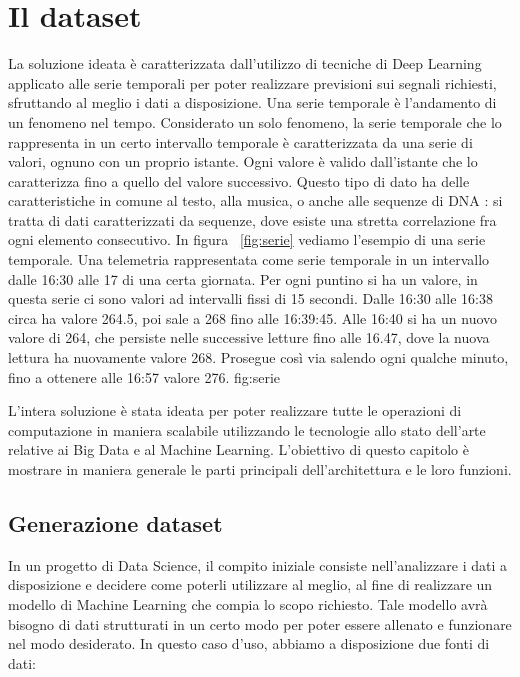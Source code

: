 \section{Il dataset}
La soluzione ideata è caratterizzata dall’utilizzo di tecniche di Deep Learning applicato alle serie temporali per poter realizzare previsioni sui segnali richiesti, sfruttando al meglio i dati a disposizione. Una serie temporale è l'andamento di un fenomeno nel tempo. Considerato un solo fenomeno, la serie temporale che lo rappresenta in un certo intervallo temporale è caratterizzata da una serie di valori, ognuno con un proprio istante. Ogni valore è valido dall'istante che lo caratterizza fino a quello del valore successivo. Questo tipo di dato ha delle caratteristiche in comune al testo, alla musica, o anche alle sequenze di DNA \cite{aggarwal}: si tratta di dati caratterizzati da sequenze, dove esiste una stretta correlazione fra ogni elemento consecutivo. In figura ~\ref{fig:serie} vediamo l'esempio di una serie temporale.
{Una telemetria rappresentata come serie temporale in un intervallo dalle 16:30 alle 17 di una certa giornata. Per ogni puntino si ha un valore, in questa serie ci sono valori ad intervalli fissi di 15 secondi. Dalle 16:30 alle 16:38 circa ha valore 264.5, poi sale a 268 fino alle 16:39:45. Alle 16:40 si ha un nuovo valore di 264, che persiste nelle successive letture fino alle 16.47, dove la nuova lettura ha nuovamente valore 268. Prosegue così via salendo ogni qualche minuto, fino a ottenere alle 16:57 valore 276. }
{fig:serie}

L’intera soluzione è stata ideata per poter realizzare tutte le operazioni di computazione in maniera scalabile utilizzando le tecnologie allo stato dell’arte relative ai Big Data e al Machine Learning. L'obiettivo di questo capitolo è mostrare in maniera generale le parti principali dell’architettura e le loro funzioni.

\subsection{Generazione dataset}
In un progetto di Data Science, il compito iniziale consiste nell’analizzare i dati a disposizione e decidere come poterli utilizzare al meglio, al fine di realizzare un modello di Machine Learning che compia lo scopo richiesto. Tale modello avrà bisogno di dati strutturati in un certo modo per poter essere allenato e funzionare nel modo desiderato. In questo caso d’uso, abbiamo a disposizione due fonti di dati:

